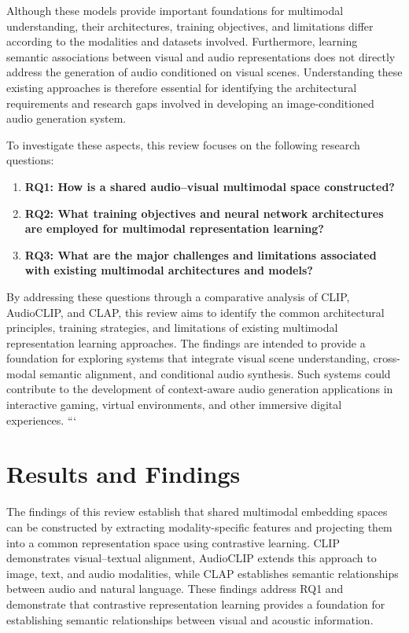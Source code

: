 \documentclass[pdflatex,sn-mathphys-num]{sn-jnl}%
\theoremstyle{thmstyleone}%
\theoremstyle{thmstyletwo}%
\theoremstyle{thmstylethree}%
\begin{document}
Although these models provide important foundations for multimodal understanding, their architectures, training objectives, and limitations differ according to the modalities and datasets involved. Furthermore, learning semantic associations between visual and audio representations does not directly address the generation of audio conditioned on visual scenes. Understanding these existing approaches is therefore essential for identifying the architectural requirements and research gaps involved in developing an image-conditioned audio generation system.

To investigate these aspects, this review focuses on the following research questions:

\begin{enumerate}
    \item \textbf{RQ1: How is a shared audio--visual multimodal space constructed?}
    \item \textbf{RQ2: What training objectives and neural network architectures are employed for multimodal representation learning?}
    \item \textbf{RQ3: What are the major challenges and limitations associated with existing multimodal architectures and models?}
\end{enumerate}

By addressing these questions through a comparative analysis of CLIP, AudioCLIP, and CLAP, this review aims to identify the common architectural principles, training strategies, and limitations of existing multimodal representation learning approaches. The findings are intended to provide a foundation for exploring systems that integrate visual scene understanding, cross-modal semantic alignment, and conditional audio synthesis. Such systems could contribute to the development of context-aware audio generation applications in interactive gaming, virtual environments, and other immersive digital experiences.
``` 

\section{Results and Findings}\label{sec7}

The findings of this review establish that shared multimodal embedding spaces can be constructed by extracting modality-specific features and projecting them into a common representation space using contrastive learning. CLIP demonstrates visual--textual alignment, AudioCLIP extends this approach to image, text, and audio modalities, while CLAP establishes semantic relationships between audio and natural language. These findings address RQ1 and demonstrate that contrastive representation learning provides a foundation for establishing semantic relationships between visual and acoustic information.
\end{document}
